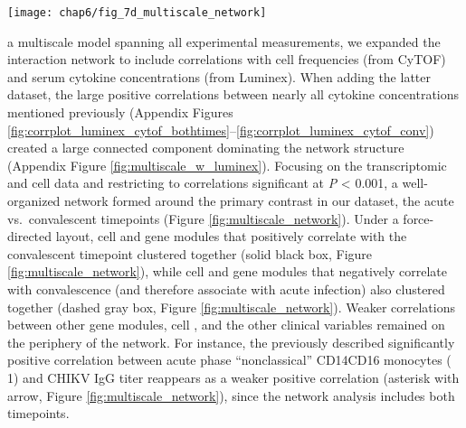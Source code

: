 \begin{figure*}[htb]
  \centering
  \texttt{[image: chap6/fig\_7d\_multiscale\_network]}
  \caption[Multiscale network of cell sub-community and coEM eigengenes]{
  \textbf{Multiscale network of cell sub-community and coEM eigengenes depicted with a force-directed layout and edge bundling.} Gold nodes, cell sub-communities; gray nodes, coEM eigengenes; large diamonds, clinical variables; red edges, positive correlations; blue edges, negative correlations. Edges are filtered to correlations significant at \emph{P} < 0.001, and thickness corresponds to the square of the correlations. A cluster of sub-communities and coEMs associated with convalescence (solid black box) and a corresponding cluster of sub-communities and coEMs associated with acute infection (dashed gray box) surround the “convalescent” node. A positive correlation between 15d post symptom onset CHIKV IgG titer and CD14+ CD16+ monocyte sub-community 1 (shown previously for acute phase samples in Figure \ref{fig:corr_cytof_igg}) is also visible (asterisk and arrow).
  }
  \label{fig:multiscale_network}
\end{figure*}

 a multiscale model spanning all experimental measurements, we expanded the interaction network to include correlations with cell \subcommunity{} frequencies (from CyTOF) and serum cytokine concentrations (from Luminex). When adding the latter dataset, the large positive correlations between nearly all cytokine concentrations mentioned previously (Appendix Figures \ref{fig:corrplot_luminex_cytof_bothtimes}–\ref{fig:corrplot_luminex_cytof_conv}) created a large connected component dominating the network structure (Appendix Figure \ref{fig:multiscale_w_luminex}). Focusing on the transcriptomic and cell \subcommunity{} data and restricting to correlations significant at \emph{P} < 0.001, a well-organized network formed around the primary contrast in our dataset, the acute vs.\ convalescent timepoints (Figure \ref{fig:multiscale_network}). Under a force-directed layout, cell \subcommunities{} and gene modules that positively correlate with the convalescent timepoint clustered together (solid black box, Figure \ref{fig:multiscale_network}), while cell \subcommunities{} and gene modules that negatively correlate with convalescence (and therefore associate with acute infection) also clustered together (dashed gray box, Figure \ref{fig:multiscale_network}). Weaker correlations between other gene modules, cell \subcommunities{}, and the other clinical variables remained on the periphery of the network. For instance, the previously described significantly positive correlation between acute phase “nonclassical” CD14\sups{+}\allowbreak CD16\sups{++} monocytes (\subcommunity{} 1) and CHIKV IgG titer reappears as a weaker positive correlation (asterisk with arrow, Figure \ref{fig:multiscale_network}), since the network analysis includes both timepoints.

